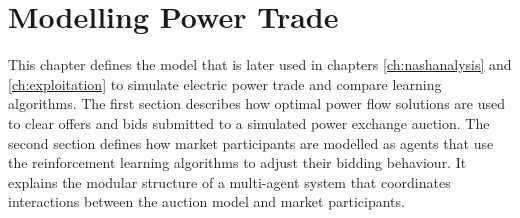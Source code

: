 \chapter{Modelling Power Trade}
\label{ch:method}
This chapter defines the model that is later used in chapters
\ref{ch:nashanalysis} and \ref{ch:exploitation} to simulate electric power
trade and compare learning algorithms. The first section describes how optimal
power flow solutions are used to clear offers and bids submitted to a
simulated power exchange auction. The second section defines how market
participants are modelled as agents that use the reinforcement learning
algorithms to adjust their bidding behaviour. It explains the modular
structure of a multi-agent system that coordinates interactions between the
auction model and market participants.

